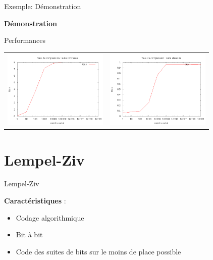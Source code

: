 \documentclass[french]{beamer}
\begin{document}
\begin{frame}{Exemple: Démonstration}
	\begin{center}
	\textbf{Démonstration}
	\end{center}
\end{frame}

\begin{frame}{Performances}
	\begin{center}
	\begin{tabular}{l | l}
	\includegraphics[width=5cm]{HConstant.png} & 
	\includegraphics[width=5cm]{aleaH.png}
	\end{tabular}
	\end{center}
\end{frame}

\section{Lempel-Ziv}
\begin{frame}{Lempel-Ziv}
	\begin{center}
	\textbf{Caractéristiques} :
	\begin{itemize}
	\item<2-4>  Codage algorithmique
	\item<3-4>  Bit à bit 
	\item<4>  Code des suites de bits sur le moins de place possible
	\end{itemize}
	\end{center}
\end{frame}
\end{document}
